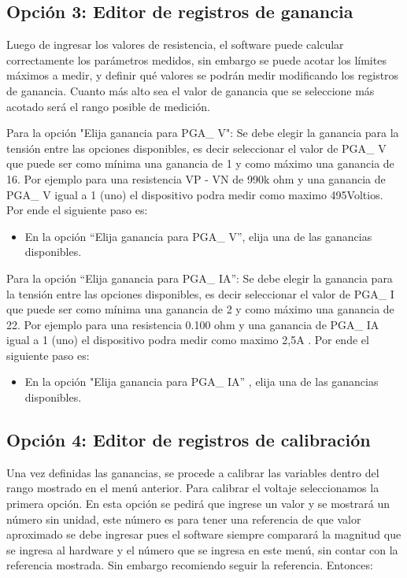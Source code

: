 \subsection{Opción 3: Editor de registros de ganancia}

Luego de ingresar los valores de resistencia, el software puede calcular correctamente los parámetros medidos, sin embargo se puede acotar los límites máximos a medir, y definir qué valores se podrán medir modificando los registros de ganancia. Cuanto más alto sea el valor de ganancia que se seleccione más acotado será el rango posible de medición.




Para la opción "Elija ganancia para PGA\_ V":
Se debe elegir la ganancia para la tensión entre las opciones disponibles, es decir seleccionar el valor de  PGA\_ V  que puede ser como mínima una ganancia de 1 y como máximo una ganancia de 16.
Por ejemplo para una resistencia VP -  VN de 990k ohm y una ganancia de PGA\_ V igual a 1 (uno) el dispositivo podra medir como maximo 495Voltios. Por ende el siguiente paso es:

\begin{itemize}
\item En la opción \textquotedblleft Elija ganancia para PGA\_ V\textquotedblright , elija una de las ganancias disponibles.
\end{itemize}

Para la opción \textquotedblleft Elija ganancia para PGA\_ IA\textquotedblright:
Se debe elegir la ganancia para la tensión entre las opciones disponibles, es decir seleccionar el valor de  PGA\_ I  que puede ser como mínima una ganancia de 2 y como máximo una ganancia de 22.
Por ejemplo para una resistencia 0.100 ohm   y una ganancia de PGA\_ IA igual a 1 (uno) el dispositivo podra medir como maximo 2,5A . Por ende el siguiente paso es:

\begin{itemize}
\item En la opción "Elija ganancia para PGA\_ IA” , elija una de las ganancias disponibles.

\end{itemize}

\subsection{Opción 4: Editor de registros de calibración}

Una vez definidas las ganancias, se procede a calibrar las variables dentro del rango mostrado en el menú anterior. Para calibrar el voltaje seleccionamos la primera opción. En esta opción se pedirá que ingrese un valor y se mostrará un número sin unidad, este número es para tener una referencia de que valor aproximado se debe ingresar pues el software siempre comparará la magnitud que se ingresa al hardware y el número que se ingresa en este menú, sin contar con la referencia mostrada. Sin embargo recomiendo seguir la referencia. Entonces:

